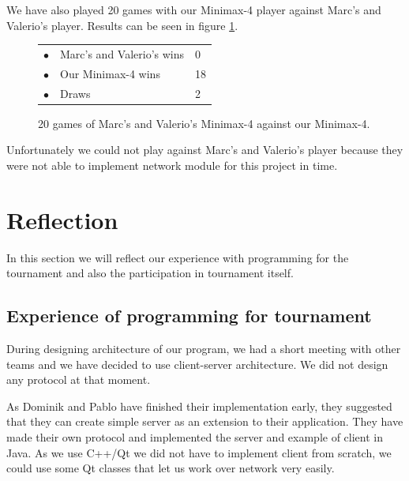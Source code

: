 \documentclass[paper=a4, fontsize=11pt]{article} %
\newcommand{\ra}[1]{\renewcommand{\arraystretch}{#1}}
\begin{document}
We have also played 20 games with our Minimax-4 player against Marc's and Valerio's player.
Results can be seen in figure \ref{fig:tournament2}.
\begin{figure}[ht]
    \begin{minipage}[c]{0.40\linewidth}
        \centering
        \ra{1.3}
        \begin{tabular}{cll}
            \toprule
            \textcolor{red!100}{$\bullet$} & Marc's and Valerio's wins & 0       \\
            \textcolor{blue!100!yellow!100!red!80}{$\bullet$} & Our Minimax-4  wins & 18      \\  
            \textcolor{gray!100}{$\bullet$} & Draws & 2      \\  
            \bottomrule
        \end{tabular}
    \end{minipage}
    \begin{minipage}[c]{0.60\linewidth}
        \centering
    \end{minipage}
    \caption{20 games of Marc's and Valerio's Minimax-4 against our Minimax-4.}
    \label{fig:tournament2}
\end{figure}


Unfortunately we could not play against Marc's and Valerio's player because they were not able to implement network module for this project in time.


\section{Reflection}
In this section we will reflect our experience with programming for the tournament and also the participation in tournament itself.

\subsection{Experience of programming for tournament}
During designing architecture of our program, we had a short  meeting with other teams and we have decided to use client-server architecture. 
We did not design any protocol at that moment.

As Dominik and Pablo have finished their implementation early, they suggested that they can create simple server as an extension to their application. 
They have made their own protocol and implemented the server and example of client in Java. 
As we use C++/Qt we did not have to implement client from scratch, we could use some Qt classes that let us work over network very easily. 
\end{document}
